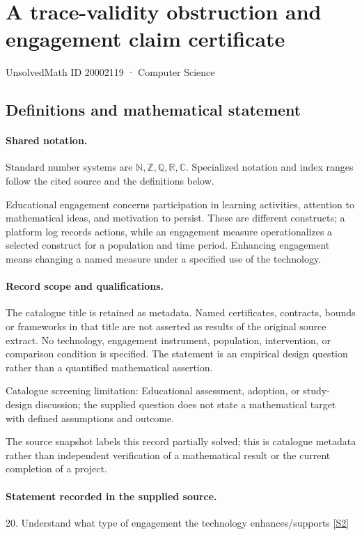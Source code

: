 \documentclass[11pt]{article}
\newcommand{\sref}[2]{\hyperlink{source:#1:#2}{[S#2]}}
\begin{document}
\setcounter{section}{20002118}
\section{A trace-validity obstruction and engagement claim certificate}\label{20002119}
{\small\sffamily UnsolvedMath ID 20002119 · Computer Science}
\subsection{Definitions and mathematical statement}

\paragraph{Shared notation.}Standard number systems are $\mathbb N,\mathbb Z,\mathbb Q,\mathbb R,\mathbb C$. Specialized notation and index ranges follow the cited source and the definitions below.


Educational engagement concerns participation in learning activities, attention to mathematical ideas, and motivation to persist. These are different constructs; a platform log records actions, while an engagement measure operationalizes a selected construct for a population and time period. Enhancing engagement means changing a named measure under a specified use of the technology.
\paragraph{Record scope and qualifications.}
The catalogue title is retained as metadata. Named certificates, contracts, bounds or frameworks in that title are not asserted as results of the original source extract.
No technology, engagement instrument, population, intervention, or comparison condition is specified. The statement is an empirical design question rather than a quantified mathematical assertion.

Catalogue screening limitation: Educational assessment, adoption, or study-design discussion; the supplied question does not state a mathematical target with defined assumptions and outcome.

The source snapshot labels this record partially solved; this is catalogue metadata rather than independent verification of a mathematical result or the current completion of a project.
\paragraph{Statement recorded in the supplied source.}
20. Understand what type of engagement the technology enhances/supports \sref{20002119}{2}
\end{document}
